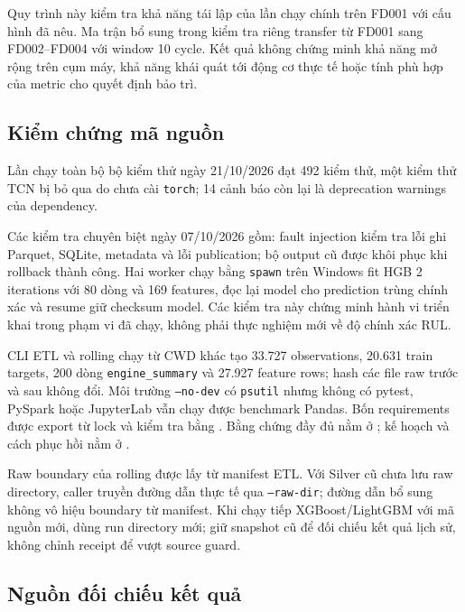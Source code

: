 Quy trình này kiểm tra khả năng tái lập của lần chạy chính trên FD001 với cấu
hình đã nêu. Ma trận bổ sung trong 
kiểm tra riêng transfer từ FD001 sang FD002--FD004 với window 10 cycle. Kết quả
không chứng minh khả năng mở rộng trên cụm máy, khả năng khái quát tới động cơ thực
tế hoặc tính phù hợp của metric cho quyết định bảo trì.

\subsection{Kiểm chứng mã nguồn}

Lần chạy toàn bộ bộ kiểm thử ngày 21/10/2026 đạt 492 kiểm thử, một kiểm thử TCN bị
bỏ qua do chưa cài \texttt{torch}; 14 cảnh báo còn lại là deprecation warnings của
dependency.

Các kiểm tra chuyên biệt ngày 07/10/2026 gồm: fault injection kiểm tra lỗi ghi Parquet, SQLite, metadata và lỗi publication;
bộ output cũ được khôi phục khi rollback thành công. Hai worker chạy bằng
\texttt{spawn} trên Windows fit HGB 2 iterations với 80 dòng và 169 features,
đọc lại model cho prediction trùng chính xác và resume giữ checksum model.
Các kiểm tra này chứng minh hành vi triển khai trong phạm vi đã chạy, không
phải thực nghiệm mới về độ chính xác RUL.

CLI ETL và rolling chạy từ CWD khác tạo 33.727 observations, 20.631 train targets,
200 dòng \texttt{engine\_summary} và 27.927 feature rows; hash các file raw trước và sau
không đổi. Môi trường \texttt{--no-dev} có \texttt{psutil} nhưng không có
pytest, PySpark hoặc JupyterLab vẫn chạy được benchmark Pandas. Bốn requirements
được export từ lock và kiểm tra bằng .
Bằng chứng đầy đủ nằm ở ; kế
hoạch và cách phục hồi nằm ở .

Raw boundary của rolling được lấy từ manifest ETL. Với Silver cũ chưa lưu
raw directory, caller truyền đường dẫn thực tế qua \texttt{--raw-dir}; đường
dẫn bổ sung không vô hiệu boundary từ manifest. Khi chạy tiếp XGBoost/LightGBM
với mã nguồn mới, dùng run directory mới; giữ snapshot cũ để đối chiếu kết quả
lịch sử, không chỉnh receipt để vượt source guard.

\subsection{Nguồn đối chiếu kết quả}

